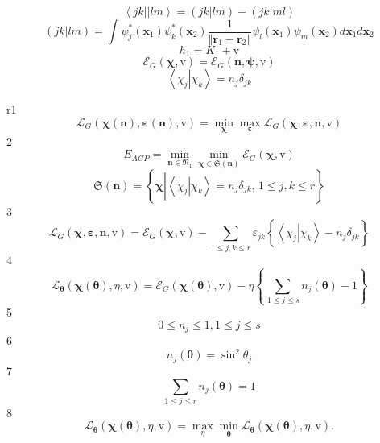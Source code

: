 \documentclass[aps,preprint]{revtex4}%
\begin{document}
\[
\left\langle jk||lm\right\rangle =\left(  \left.  jk\right\vert lm\right)
-\left(  \left.  jk\right\vert ml\right)
\]%
\[
\left(  \left.  jk\right\vert lm\right)  =\int\psi_{j}^{\ast}\left(
\mathbf{x}_{1}\right)  \psi_{k}^{\ast}\left(  \mathbf{x}_{2}\right)  \frac
{1}{\left\Vert \mathbf{r}_{1}-\mathbf{r}_{2}\right\Vert }\psi_{l}\left(
\mathbf{x}_{1}\right)  \psi_{m}\left(  \mathbf{x}_{2}\right)  d\mathbf{x}%
_{1}d\mathbf{x}_{2}%
\]%
\[
h_{1}=K_{1}+\mathrm{v}%
\]%
\[
\mathcal{E}_{G}\left(  \mathbf{\chi,}\mathrm{v}\right)  =\mathcal{E}%
_{G}\left(  \mathbf{n,\psi,}\mathrm{v}\right)
\]%
\[
\left\langle \left.  \chi_{j}\right\vert \chi_{k}\right\rangle =n_{j}%
\delta_{jk}%
\]


r1%
\[
\mathcal{L}_{G}\left(  \mathbf{\chi}\left(  \mathbf{n}\right)
,\mathbf{\varepsilon}\left(  \mathbf{n}\right)  ,\mathrm{v}\right)
=\min_{\mathbf{\chi}}\max_{\mathbf{\varepsilon}}\mathcal{L}_{G}\left(
\mathbf{\chi},\mathbf{\varepsilon,n,}\mathrm{v}\right)
\]
2%
\[
E_{AGP}=\min_{\mathbf{n\in}\mathfrak{N}_{1}}\min_{\mathbf{\chi\in}%
\mathfrak{S}\left(  \mathbf{n}\right)  }\mathcal{E}_{G}\left(  \mathbf{\chi
,}\mathrm{v}\right)
\]%
\[
\mathfrak{S}\left(  \mathbf{n}\right)  =\left\{  \mathbf{\chi}\left\vert
\overset{}{\left\langle \left.  \chi_{j}\right\vert \chi_{k}\right\rangle
=n_{j}\delta_{jk},\,1\leq j,k\leq r}\right.  \right\}
\]
3%
\[
\mathcal{L}_{G}\left(  \mathbf{\chi},\mathbf{\varepsilon,n,}\mathrm{v}\right)
=\mathcal{E}_{G}\left(  \mathbf{\chi,}\mathrm{v}\right)  -\sum_{1\leq j,k\leq
r}\varepsilon_{jk}\left\{  \overset{}{\left\langle \left.  \chi_{j}\right\vert
\chi_{k}\right\rangle -n_{j}\delta_{jk}}\right\}
\]
4%
\[
\mathcal{L}_{\mathbf{\theta}}\left(  \mathbf{\chi}\left(  \mathbf{\theta
}\right)  ,\eta,\mathrm{v}\right)  =\mathcal{E}_{G}\left(  \mathbf{\chi
}\left(  \mathbf{\theta}\right)  \mathbf{,}\mathrm{v}\right)  -\eta\left\{
\sum_{\,1\leq j\leq s}n_{j}\left(  \mathbf{\theta}\right)  -1\right\}
\]
5%
\[
0\leq n_{j}\leq1,1\leq j\leq s
\]
6%
\[
n_{j}\left(  \mathbf{\theta}\right)  =\sin^{2}\theta_{j}%
\]
7%
\[
\sum_{1\leq j\leq r}n_{j}\left(  \mathbf{\theta}\right)  =1
\]
8%
\[
\mathcal{L}_{\mathbf{\theta}}\left(  \mathbf{\chi}\left(  \mathbf{\theta
}\right)  ,\eta,\mathrm{v}\right)  =\max_{\eta}\min_{\mathbf{\theta}%
}\mathcal{L}_{\mathbf{\theta}}\left(  \mathbf{\chi}\left(  \mathbf{\theta
}\right)  ,\eta,\mathrm{v}\right)  .
\]
\end{document}
